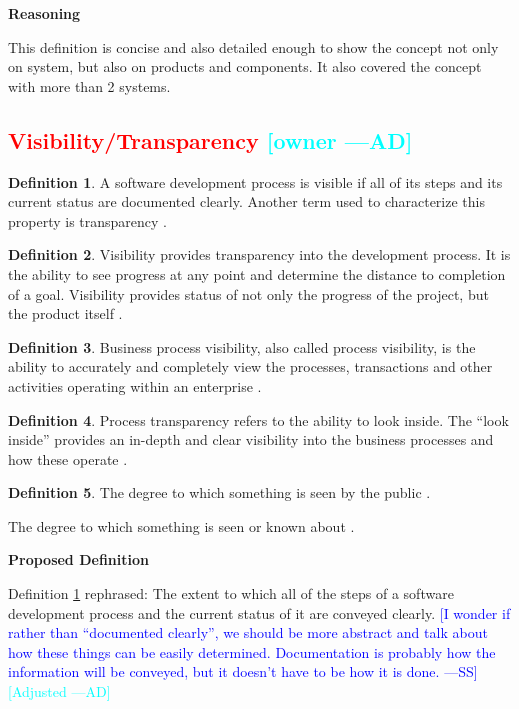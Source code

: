 \documentclass[letterpaper,cleveref]{lipics-v2019}
\newcommand{\authornote}[3]{\textcolor{#1}{[#3 ---#2]}}
\newcommand{\authornote}[3]{}
\newcommand{\wss}[1]{\authornote{blue}{SS}{#1}} %
\newcommand{\ad}[1]{\authornote{cyan}{AD}{#1}} %
\newcommand{\notdone}[1]{\textcolor{red}{#1}}
\theoremstyle{definition}
\newtheorem{defn}{Definition}
\begin{document}
\noindent \textbf{Reasoning}

This definition is concise and also detailed enough to show the concept not only
on system, but also on products and components. It also covered the concept with
more than 2 systems.

\subsection{\notdone{Visibility/Transparency} \ad{owner}}

\begin{defn}
  \label{VisibilitySelected}
  A software development process is visible if all of its steps and its current
  status are documented clearly. Another term used to characterize this property
  is transparency \citep{ghezzi1991fundamentals}.
\end{defn}

\begin{defn}
  Visibility provides transparency into the development process. It is the
  ability to see progress at any point and determine the distance to completion
  of a goal.  Visibility provides status of not only the progress of the
  project, but the product itself \citep{GSA2019}.
\end{defn}

\begin{defn}
  Business process visibility, also called process visibility, is the ability to
  accurately and completely view the processes, transactions and other
  activities operating within an enterprise \citep{Rouse2013}.
\end{defn}

\begin{defn}
  Process transparency refers to the ability to look inside. The “look inside”
  provides an in-depth and clear visibility into the business processes and how
  these operate \citep{PRIME2019}.
\end{defn}

\begin{defn}
The degree to which something is seen by the public
\citep{CambridgeVisibility2019}.
	
The degree to which something is seen or known about
\citep{CambridgeVisibility2019}.
\end{defn}

\noindent \textbf{Proposed Definition} 

Definition \ref{VisibilitySelected} rephrased: The extent to which all of the
steps of a software development process and the current status of it are 
conveyed clearly. \wss{I wonder if rather than
  ``documented clearly'', we should be more abstract and talk about how these
  things can be easily determined.  Documentation is probably how the
  information will be conveyed, but it doesn't have to be how it is done.}  \ad{Adjusted}
\end{document}
